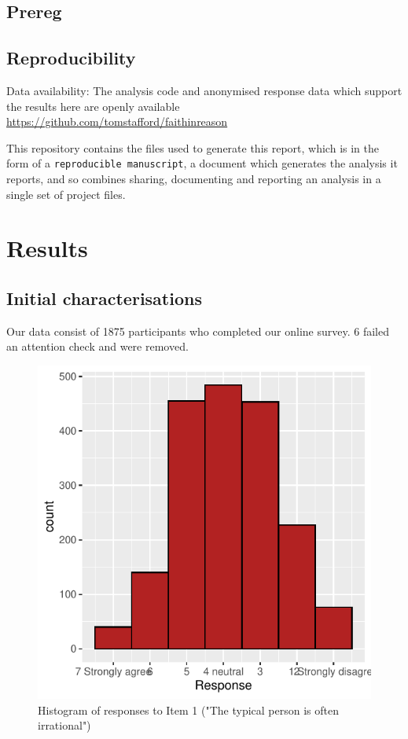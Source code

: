 \documentclass[
  ,jou,floatsintext]{apa6}
\begin{document}
\hypertarget{prereg}{%
\subsection{Prereg}\label{prereg}}

\hypertarget{reproducibility}{%
\subsection{Reproducibility}\label{reproducibility}}

Data availability: The analysis code and anonymised response data which support the results here are openly available \url{https://github.com/tomstafford/faithinreason}

This repository contains the files used to generate this report, which is in the form of a \texttt{reproducible\ manuscript}, a document which generates the analysis it reports, and so combines sharing, documenting and reporting an analysis in a single set of project files.

\hypertarget{results}{%
\section{Results}\label{results}}

\hypertarget{initial-characterisations}{%
\subsection{Initial characterisations}\label{initial-characterisations}}

Our data consist of 1875 participants who completed our online survey. 6 failed an attention check and were removed.

\begin{figure}

{\centering \includegraphics[width=0.75\linewidth]{faithinreason_files/figure-latex/ourhistogram-1} 

}

\caption{Histogram of responses to Item 1 ("The typical person is often irrational")}\label{fig:ourhistogram}
\end{figure}
\end{document}
